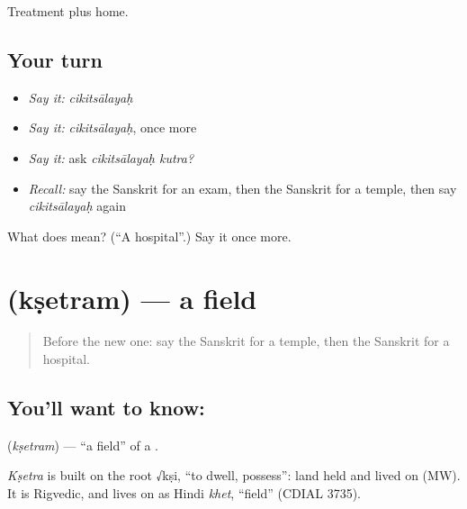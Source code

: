 \begin{grammarlens}[title={What you've built}]
Treatment plus home.
\end{grammarlens}

\subsection*{Your turn}
\begin{itemize}
\raggedright
  \item \emph{Say it:} \emph{cikitsālayaḥ}
  \item \emph{Say it:} \emph{cikitsālayaḥ}, once more
  \item \emph{Say it:} ask \emph{cikitsālayaḥ kutra?}
  \item \emph{Recall:} say the Sanskrit for an exam, then the Sanskrit for a temple, then say \emph{cikitsālayaḥ} again
\end{itemize}

\begin{tcolorbox}[breakable,colback=teal!4,colframe=teal!35!black,title={Before you move on}]
What does  mean? (\textquotedblleft{}A hospital\textquotedblright{}.) Say it once more.
\end{tcolorbox}
\section[\texorpdfstring{\sk{क्षेत्रम्} (kṣetram)}{क्षेत्रम् (kṣetram)}]{ (kṣetram) — a field}

\label{lesson:SA-C84-field}



\begin{quote}
Before the new one: say the Sanskrit for a temple, then the Sanskrit for a hospital.
\end{quote}

\subsection*{You'll want to know: }
\textbf{} (\emph{kṣetram}) — \textquotedblleft{}a field\textquotedblright{} of a \textbf{}.

\begin{cousinweb}
\emph{Kṣetra} is built on the root √kṣi, \textquotedblleft{}to dwell, possess\textquotedblright{}: land held and lived on (MW). It is Rigvedic, and lives on as Hindi \emph{khet}, \textquotedblleft{}field\textquotedblright{} (CDIAL 3735).
\end{cousinweb}

